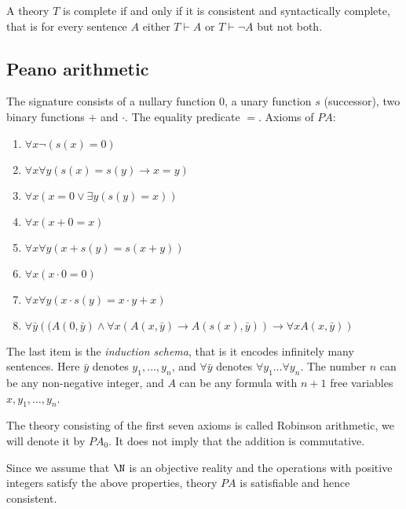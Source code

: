 \begin{page}
\setcounter{section}{3}
\setcounter{subsection}{2}
\setcounter{dfn}{24}
\label{portion:648}

\begin{cor}
A theory $T$ is complete if and only if it is consistent and syntactically complete,
that is for every sentence $A$ either $T \vdash A$ or $T \vdash \neg A$ but not both.
\end{cor}

\end{page}

\begin{page}
\setcounter{section}{3}
\setcounter{subsection}{4}
\setcounter{dfn}{24}
\label{portion:650}

\subsection{Peano arithmetic}
The signature consists of a nullary function $0$, a unary function $s$ (successor), two binary functions $+$ and $\cdot$.
The equality predicate $=$.
Axioms of $PA$:
\begin{enumerate}
\item
$\forall x \neg(s(x) = 0)$
\item
$\forall x \forall y (s(x)=s(y) \to x=y)$
\item
$\forall x (x = 0 \vee \exists y (s(y)=x))$
\item
$\forall x (x+0=x)$
\item
$\forall x \forall y (x+s(y) = s(x+y))$
\item
$\forall x (x \cdot 0 = 0)$
\item
$\forall x \forall y (x \cdot s(y) = x \cdot y + x)$
\item
$\forall \bar y \left((A(0, \bar y) \wedge \forall x (A(x, \bar y) \to A(s(x), \bar y)) \to \forall x A(x, \bar y)\right)$
\end{enumerate}
The last item is the \emph{induction schema}, that is it encodes infinitely many sentences.
Here $\bar y$ denotes $y_1, \ldots, y_n$, and $\forall \bar y$ denotes $\forall y_1 \ldots \forall y_n$.
The number $n$ can be any non-negative integer, and $A$ can be any formula with $n+1$ free variables $x, y_1, \ldots, y_n$.


The theory consisting of the first seven axioms is called Robinson arithmetic, we will denote it by $PA_0$.
It does not imply that the addition is commutative.

Since we assume that $\N$ is an objective reality and the operations with positive integers satisfy the above properties,
theory $PA$ is satisfiable and hence consistent.






\end{page}

